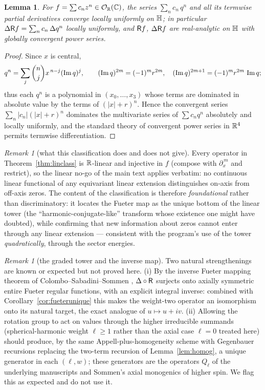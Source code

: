 \documentclass[11pt]{amsart}
\newtheorem{lemma}[theorem]{Lemma}
\theoremstyle{definition}
\theoremstyle{remark}
\newtheorem{remark}[theorem]{Remark}
\begin{document}
\begin{lemma}\label{lem:series}
For $f=\sum c_nz^n\in\mathcal{O}_{\mathbb{R}}(\mathbb{C})$, the series $\sum_nc_n\,q^n$ and all its
termwise partial derivatives converge locally uniformly on $\mathbb{H}$; in
particular $\Delta\mathsf{R} f=\sum_nc_n\,\Delta q^n$ locally uniformly, and
$\mathsf{R} f$, $\Delta\mathsf{R} f$ are real-analytic on $\mathbb{H}$ with globally
convergent power series.
\end{lemma}

\begin{proof}
Since $x$ is central,
\[
q^n=\sum_{j}\binom njx^{\,n-j}(\operatorname{Im} q)^j,\qquad
(\operatorname{Im} q)^{2m}=(-1)^mr^{2m},\quad
(\operatorname{Im} q)^{2m+1}=(-1)^mr^{2m}\,\operatorname{Im} q;
\]
thus
each $q^n$ is a polynomial in $(x_0,\dots,x_3)$ whose terms are
dominated in absolute value by the terms of $(|x|+r)^n$.  Hence the
convergent series $\sum_n|c_n|(|x|+r)^n$ dominates the multivariate
series of $\sum c_nq^n$ absolutely and locally uniformly, and the
standard theory of convergent power series in $\mathbb{R}^4$ permits termwise
differentiation.
\end{proof}

\begin{remark}[what this classification does and does not
give]\label{rem:noinfo}
Every operator in Theorem~\ref{thm:linclass} is $\mathbb{R}$-linear and
injective in $f$ (compose with $\partial_x^{\,m}$ and restrict), so the
linear no-go of the main text applies verbatim: no continuous linear
functional of any equivariant linear extension distinguishes on-axis from
off-axis zeros.
The content of the classification is therefore \emph{foundational} rather
than discriminatory: it locates the Fueter map as the unique bottom of
the linear tower (the ``harmonic-conjugate-like'' transform whose
existence one might have doubted), while confirming that new information
about zeros cannot enter through any linear extension --- consistent with
the program's use of the tower \emph{quadratically}, through the sector
energies.
\end{remark}

\begin{remark}[the graded tower and the inverse
map]\label{rem:elltower}
Two natural strengthenings are known or expected but not proved here.
(i) By the inverse Fueter mapping theorem of Colombo--Sabadini--Sommen
\cite{app-CSS}, $\Delta\circ\mathsf{R}$ surjects onto axially symmetric entire
Fueter regular functions, with an explicit integral inverse: combined
with Corollary~\ref{cor:fueterunique} this makes the weight-two operator
an isomorphism onto its natural target, the exact analogue of
$u\mapsto u+iv$.  (ii) Allowing the rotation group to act on values
through the higher irreducible summands (spherical-harmonic weight
$\ell\ge1$ rather than the axial case $\ell=0$ treated here) should
produce, by the same Appell-plus-homogeneity scheme with Gegenbauer
recursions replacing the two-term recursion of Lemma~\ref{lem:homog}, a
unique generator in each $(\ell,w)$; these generators are the operators
$Q_\ell$ of the underlying manuscripts and Sommen's axial monogenics of
higher spin.  We flag this as expected and do not use it.
\end{remark}
\end{document}
